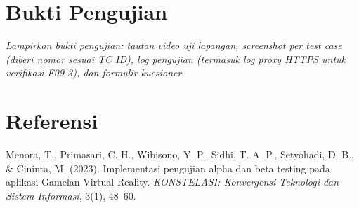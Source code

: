 \chapter{Bukti Pengujian}
\label{lampiran:bukti-pengujian}

\textit{Lampirkan bukti pengujian: tautan video uji lapangan, screenshot per test case (diberi nomor sesuai TC ID), log pengujian (termasuk log proxy HTTPS untuk verifikasi F09-3), dan formulir kuesioner.}

\chapter*{Referensi}

Menora, T., Primasari, C. H., Wibisono, Y. P., Sidhi, T. A. P., Setyohadi, D. B., \& Cininta, M. (2023). Implementasi pengujian alpha dan beta testing pada aplikasi Gamelan Virtual Reality. \textit{KONSTELASI: Konvergensi Teknologi dan Sistem Informasi}, 3(1), 48--60.
